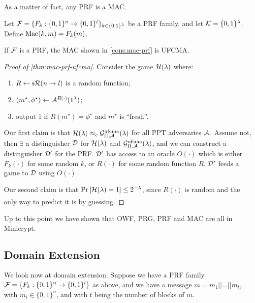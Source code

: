 As a matter of fact, any \ac{PRF} is a \ac{MAC}.

\begin{construction} \label{cons:mac-prf}
	Let $\mathcal{F} = \{ F_k : \{0,1\}^{n} \to \{0,1\}^{l} \}_{k \in \{0,1\}^{\lambda}}$ be a \ac{PRF} family, and let $\mathcal{K} = \{0,1\}^{\lambda}$.
	Define $\mathrm{Mac}(k, m) = F_k(m)$.
\end{construction}

\begin{theorem} \label{thm:mac-prf-ufcma}
	If $\mathcal{F}$ is a \ac{PRF}, the \ac{MAC} shown in \cref{cons:mac-prf} is \ac{UFCMA}.
\end{theorem}

\begin{proof}[Proof of \cref{thm:mac-prf-ufcma}]
	Consider the game $\mathcal{H}(\lambda)$ where:
	\begin{enumerate}
		\item $R \leftarrow {\scriptstyle \$} {\mathcal{R}(n \to l)}$ is a random function;
		\item $(m^{\star}, \phi^{\star}) \leftarrow \mathcal{A}^{R(\cdot)} (1^{\lambda})$;
		\item output $1$ if $R(m^{\star}) = \phi^{\star}$ and $m^{\star}$ is ``fresh''.
	\end{enumerate}
	Our first claim is that $\mathcal{H}(\lambda) \approx_c \mathcal{G}^{\scriptstyle \text{ufcma}}_{\Pi_{},\mathcal{A}}(\lambda)$ for all \ac{PPT} adversaries $\mathcal{A}$.
	Assume not, then $\exists$ a distinguisher $\mathcal{D}$ for $\mathcal{H}(\lambda)$ and $\mathcal{G}^{\scriptstyle \text{ufcma}}_{\Pi_{},\mathcal{A}}(\lambda)$, and we can construct a distinguisher $\mathcal{D}'$ for the \ac{PRF}.
	$\mathcal{D}'$ has access to an oracle $O(\cdot)$ which is either $F_k(\cdot)$ for some random $k$, or $R(\cdot)$ for some random function $R$.
	$\mathcal{D}'$ feeds a game to $\mathcal{D}$ using $O(\cdot)$.

	Our second claim is that $\mathop{\mathrm{Pr}}\limits_{} \left[ {\mathcal{H}(\lambda) = 1} \right] \le 2^{-\lambda}$, since $R(\cdot)$ is random and the only way to predict it is by guessing.
\end{proof}

Up to this point we have shown that \ac{OWF}, \ac{PRG}, \ac{PRF} and \ac{MAC} are all in Minicrypt.

\subsection{Domain Extension}

We look now at domain extension.
Suppose we have a \ac{PRF} family $\mathcal{F} = \{ F_k : \{0,1\}^{n} \to \{0,1\}^{l}\}$ as above, and we have a message $m = m_1 || \dots || m_t$, with $m_i \in \{0,1\}^{n}$, and with $t$ being the number of blocks of $m$.

